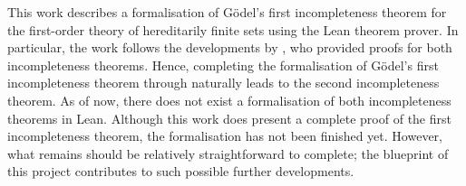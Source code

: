 \noindent This work describes a formalisation of Gödel's first incompleteness theorem
for the first-order theory of hereditarily finite sets using the Lean theorem prover.
In particular, the work follows the developments by \cite{swierczkowski2003finite},
who provided proofs for both incompleteness theorems.
Hence, completing the formalisation of Gödel's first incompleteness theorem through 
\cite{swierczkowski2003finite} naturally leads to the second incompleteness theorem.
As of now, there does not exist a formalisation of both incompleteness theorems in Lean.
Although this work does present a complete proof of the first incompleteness theorem,
the formalisation has not been finished yet. 
However, what remains should be relatively straightforward to complete; 
the blueprint of this project contributes to such possible further developments.
